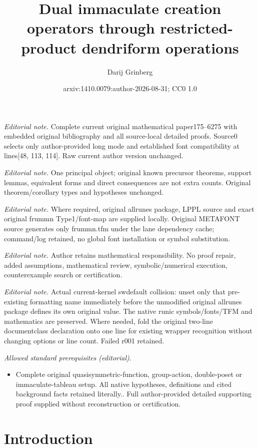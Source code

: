 \documentclass[numbers=enddot,12pt,final,onecolumn,notitlepage,abstracton]{scrartcl}%
\title{Dual immaculate creation operators through restricted-product dendriform operations}
\author{Darij Grinberg}
\date{arxiv:1410.0079:author-2026-08-31; CC0 1.0}
\theoremstyle{definition}
\begin{document}
\maketitle
\noindent\textit{Editorial note.} Complete current original mathematical paper175--6275 with embedded original bibliography and all source-local detailed proofs. Source0 selects only author-provided long mode and established font compatibility at lines[48, 113, 114]. Raw current author version unchanged.\par\medskip
\noindent\textit{Editorial note.} One principal object; original known precursor theorems, support lemmas, equivalent forms and direct consequences are not extra counts. Original theorem/corollary types and hypotheses unchanged.\par\medskip
\noindent\textit{Editorial note.} Where required, original allrunes package, LPPL source and exact original frummn Type1/font-map are supplied locally. Original METAFONT source generates only frummn.tfm under the lane dependency cache; command/log retained, no global font installation or symbol substitution.\par\medskip
\noindent\textit{Editorial note.} Author retains mathematical responsibility. No proof repair, added assumptions, mathematical review, symbolic/numerical execution, counterexample search or certification.\par\medskip
\noindent\textit{Editorial note.} Actual current-kernel swdefault collision: unset only that pre-existing formatting name immediately before the unmodified original allrunes package defines its own original value. The native runic symbols/fonts/TFM and mathematics are preserved. Where needed, fold the original two-line documentclass declaration onto one line for existing wrapper recognition without changing options or line count. Failed r001 retained.\par\medskip
\noindent\textit{Allowed standard prerequisites (editorial).}\begin{itemize}
\item Complete original quasisymmetric-function, group-action, double-poset or immaculate-tableau setup. All native hypotheses, definitions and cited background facts retained literally.. Full author-provided detailed supporting proof supplied without reconstruction or certification.
\end{itemize}\medskip
\section{Introduction}
\end{document}
